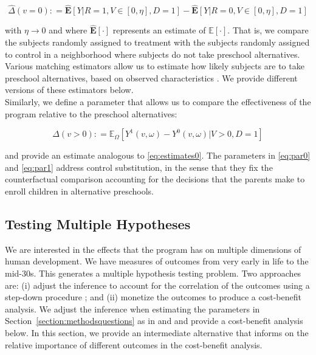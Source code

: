 \begin{equation}
\widehat{\Delta} \left( v = 0 \right) : = \widehat{\mathbf{E}} \left[ Y | R = 1, V \in \left[ 0 , \eta \right], D = 1 \right] - \widehat{\mathbf{E}} \left[ Y | R = 0, V \in \left[ 0 , \eta \right], D = 1 \right] \label{eq:estimates0}
\end{equation}

\noindent with $\eta \rightarrow 0$ and where $\widehat{\mathbf{E}}[\cdot]$ represents an estimate of $\mathbb{E}[\cdot]$. That is, we compare the subjects randomly assigned to treatment with the subjects randomly assigned to control in a neighborhood where subjects do not take preschool alternatives. Various matching estimators allow us to estimate how likely subjects are to take preschool alternatives, based on observed characteristics \citep{Heckman_Ichimura_etal_1997_REStud,Heckman_Ichimura_etal_1998_REStud}. We provide different versions of these estimators below.\\

\noindent Similarly, we define a parameter that allows us to compare the effectiveness of the program relative to the preschool alternatives: 

\begin{equation}
\Delta \left( v > 0 \right) : =   \mathbb{E}_{\Omega} \left[ Y^1 \left( v, \omega \right) - Y^0 \left( v, \omega \right) | V > 0, D = 1 \right] \label{eq:par1}
\end{equation}

\noindent and provide an estimate analogous to \eqref{eq:estimates0}. The parameters in \eqref{eq:par0} and \eqref{eq:par1} address control substitution, in the sense that they fix the counterfactual comparison accounting for the decisions that the parents make to enroll children in alternative preschools.

\subsection{Testing Multiple Hypotheses}  \label{section:counts}

\noindent We are interested in the effects that the program has on multiple dimensions of human development. We have measures of outcomes from very early in life to the mid-30s. This generates a multiple hypothesis testing problem. Two approaches are: (i) adjust the inference to account for the correlation of the outcomes using a step-down procedure \citep{Lehman_Romano_2005_AnnStat,Romano_Shaikh_2006_AnnStat}; and (ii) monetize the outcomes to produce a cost-benefit analysis. We adjust the inference when estimating the parameters in Section~\ref{section:methodsquestions} as in \citet{Lehman_Romano_2005_AnnStat} and \citet{Romano_Shaikh_2006_AnnStat} and provide a cost-benefit analysis below. In this section, we provide an intermediate alternative that informs on the relative importance of different outcomes in the cost-benefit analysis.\\

